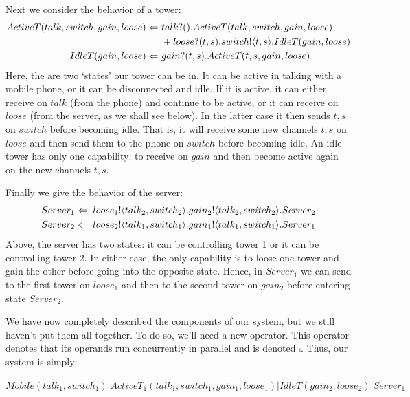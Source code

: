 	Next we consider the behavior of a tower:
	\begin{align*}
		ActiveT(talk,switch,gain,loose) \Leftarrow\  & {talk}?({}).ActiveT(talk,switch,gain,loose) \\  
		 & +{loose}?({t,s}).{switch}!\langle{t,s}\rangle.IdleT(gain, loose)\\
		IdleT(gain,loose) \Leftarrow\  & {gain}?({t,s}).ActiveT(t,s,gain,loose)\\
	\end{align*}
Here, the are two `states' our tower can be in.  It can be active in talking with a mobile phone, or it can be disconnected and idle.  If it is active, it can either receive on $talk$ (from the phone) and continue to be active, or it can receive on $loose$ (from the server, as we shall see below).  In the latter case it then sends $t,s$ on $switch$ before becoming idle.  That is, it will receive some new channels $t,s$ on $loose$ and then send them to the phone on $switch$ before becoming idle.  An idle tower has only one capability: to receive on $gain$ and then become active again on the new channels $t,s$.

Finally we give the behavior of the server:
\begin{align*}
	Server_1 \Leftarrow\  {loose_1}!\langle{talk_2,switch_2}\rangle. {gain_2}!\langle{talk_2,switch_2}\rangle. Server_2\\
	Server_2 \Leftarrow\  {loose_2}!\langle{talk_1,switch_1}\rangle. {gain_1}!\langle{talk_1,switch_1}\rangle. Server_1
\end{align*}
Above, the server has two states: it can be controlling tower 1 or it can be controlling tower 2.  In either case, the only capability is to loose one tower and gain the other before going into the opposite state.  Hence, in $Server_1$ we can send to the first tower on $loose_1$ and then to the second tower on $gain_2$ before entering state $Server_2$.

We have now completely described the components of our system, but we still haven't put them all together.  To do so, we'll need a new operator.  This operator denotes that its operands run concurrently in parallel and is denoted $\comp$.  Thus, our system is simply:
\begin{center}
	\small{$\textstyle Mobile(talk_1,switch_1)|ActiveT_1(talk_1,switch_1,gain_1,loose_1)|IdleT(gain_2,loose_2)|Server_1$}
\end{center}

